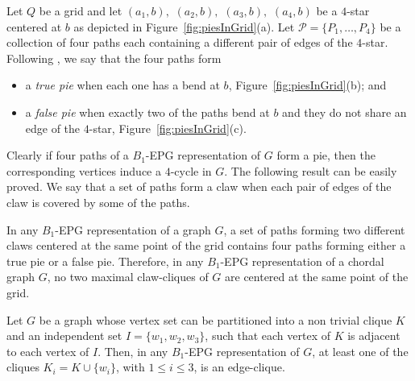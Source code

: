 
Let $ Q $ be a grid and let $ (a_1, b),$ $(a_2, b),$ $(a_3, b),$ $(a_4, b)$ be a $4$-star centered at $b$ as depicted in Figure~\ref{fig:piesInGrid}(a). Let $ \mathcal{P} = \{P_1, \dots , P_4\}$ be a collection of four paths each containing a different pair of edges of the $4$-star.
Following \cite{golumbic2009}, we say that the four paths form
\begin{itemize}
\item a \emph{true pie} %
when each one has a bend at $b$, Figure~\ref{fig:piesInGrid}(b); and 
\item a \emph {false pie} when exactly two of the paths %
bend at $b$ and they do not share an edge of the $4$-star, Figure~\ref{fig:piesInGrid}(c). %



\end{itemize}

Clearly if four paths of a $B_1$-EPG representation of $G$ form a pie, then the corresponding vertices induce a $4$-cycle in $G$. %
The following result can be easily proved. We say that a set of paths form a claw when each pair of edges of the claw is covered by some of the paths.

\begin{lema}\label{lem:twoClawNotSameCenterInChordal}
In any $B_1$-EPG representation of a graph $G$, a set of paths forming two different claws centered at the same point of the grid contains four paths forming either a true pie or a false pie. Therefore, in any $B_1$-EPG representation of a chordal graph $G$, no two maximal claw-cliques of $G$ are centered at the same point of the grid.
\end{lema}

\begin{lema}\label{lem:3cliquesNotClaw}
Let $G$ be a graph whose vertex set  can be
partitioned into a non trivial clique $K$ and an independent set $I=\{w_1,w_2,w_3\}$, such that each vertex of $K$ is adjacent to each vertex of $I$. Then, in any $B_1$-EPG representation of $G$, at least one of the cliques  $K_i = K \cup \{w_i\}$, with $1 \leq i \leq 3$,  is an edge-clique. 
\end{lema}


